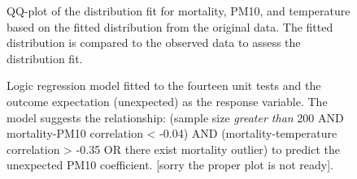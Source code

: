 \documentclass[
  12pt,
]{interact}
\begin{document}
\label{cell-fig-dist-fit}
\begin{figure}[H]


\caption{\label{fig-dist-fit}QQ-plot of the distribution fit for
mortality, PM10, and temperature based on the fitted distribution from
the original data. The fitted distribution is compared to the observed
data to assess the distribution fit.}

\end{figure}%

\begin{figure}


\caption{\label{fig-linear-reg-tree}Logic regression model fitted to the
fourteen unit tests and the outcome expectation (unexpected) as the
response variable. The model suggests the relationship: (sample size
\emph{greater than} 200 AND mortality-PM10 correlation \textless{}
-0.04) AND (mortality-temperature correlation \textgreater{} -0.35 OR
there exist mortality outlier) to predict the unexpected PM10
coefficient. {[}sorry the proper plot is not ready{]}.}

\end{figure}%
\end{document}
